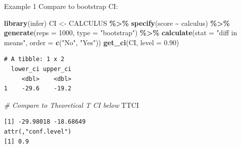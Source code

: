 \documentclass[
  ignorenonframetext,
]{beamer}
\newenvironment{Shaded}{\begin{snugshade}}{\end{snugshade}}
\newcommand{\AttributeTok}[1]{\textcolor[rgb]{0.13,0.29,0.53}{#1}}
\newcommand{\CommentTok}[1]{\textcolor[rgb]{0.56,0.35,0.01}{\textit{#1}}}
\newcommand{\DecValTok}[1]{\textcolor[rgb]{0.00,0.00,0.81}{#1}}
\newcommand{\FloatTok}[1]{\textcolor[rgb]{0.00,0.00,0.81}{#1}}
\newcommand{\FunctionTok}[1]{\textcolor[rgb]{0.13,0.29,0.53}{\textbf{#1}}}
\newcommand{\NormalTok}[1]{#1}
\newcommand{\OtherTok}[1]{\textcolor[rgb]{0.56,0.35,0.01}{#1}}
\newcommand{\SpecialCharTok}[1]{\textcolor[rgb]{0.81,0.36,0.00}{\textbf{#1}}}
\newcommand{\StringTok}[1]{\textcolor[rgb]{0.31,0.60,0.02}{#1}}
\begin{document}
\begin{frame}[fragile]{Example 1}
\protect\hypertarget{example-1-4}{}
Compare to bootstrap CI: \tiny

\begin{Shaded}
\begin{Highlighting}[]
\FunctionTok{library}\NormalTok{(infer)}
\NormalTok{CI }\OtherTok{\textless{}{-}}\NormalTok{ CALCULUS }\SpecialCharTok{\%\textgreater{}\%} 
  \FunctionTok{specify}\NormalTok{(score }\SpecialCharTok{\textasciitilde{}}\NormalTok{ calculus) }\SpecialCharTok{\%\textgreater{}\%} 
  \FunctionTok{generate}\NormalTok{(}\AttributeTok{reps =} \DecValTok{1000}\NormalTok{, }\AttributeTok{type =} \StringTok{"bootstrap"}\NormalTok{) }\SpecialCharTok{\%\textgreater{}\%} 
  \FunctionTok{calculate}\NormalTok{(}\AttributeTok{stat =} \StringTok{"diff in means"}\NormalTok{, }\AttributeTok{order =} \FunctionTok{c}\NormalTok{(}\StringTok{"No"}\NormalTok{, }\StringTok{"Yes"}\NormalTok{))}
\FunctionTok{get\_ci}\NormalTok{(CI, }\AttributeTok{level =} \FloatTok{0.90}\NormalTok{)}
\end{Highlighting}
\end{Shaded}

\begin{verbatim}
# A tibble: 1 x 2
  lower_ci upper_ci
     <dbl>    <dbl>
1    -29.6    -19.2
\end{verbatim}

\begin{Shaded}
\begin{Highlighting}[]
\CommentTok{\# Compare to Theoretical T CI below}
\NormalTok{TTCI}
\end{Highlighting}
\end{Shaded}

\begin{verbatim}
[1] -29.98018 -18.68649
attr(,"conf.level")
[1] 0.9
\end{verbatim}

\normalsize
\end{frame}
\end{document}
